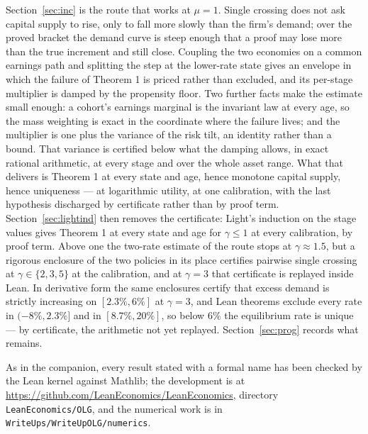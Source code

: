 Section~\ref{sec:inc} is the route that works at $\mu=1$. Single crossing does not ask capital supply
to rise, only to fall more slowly than the firm's demand; over the proved bracket the demand curve is
steep enough that a proof may lose more than the true increment and still close. Coupling the two
economies on a common earnings path and splitting the step at the lower-rate state gives an envelope
in which the failure of Theorem 1 is priced rather than excluded, and its per-stage multiplier is
damped by the propensity floor. Two further facts make the estimate small enough: a cohort's earnings
marginal is the invariant law at every age, so the mass weighting is exact in the coordinate where the
failure lives; and the multiplier is one plus the variance of the risk tilt, an identity rather than a
bound. That variance is certified below what the damping allows, in exact rational arithmetic, at every
stage and over the whole asset range. What that delivers is Theorem 1 at every state and age, hence
monotone capital supply, hence uniqueness --- at logarithmic utility, at one calibration, with the last
hypothesis discharged by certificate rather than by proof term. Section~\ref{sec:lightind} then
removes the certificate: Light's induction on the stage values gives Theorem 1 at every state and age
for $\gamma\le1$ at every calibration, by proof term. Above one the two-rate estimate of the route
stops at $\gamma\approx1.5$, but a rigorous enclosure of the two policies in its place certifies
pairwise single crossing at $\gamma\in\{2,3,5\}$ at the calibration, and at $\gamma=3$ that
certificate is replayed inside Lean. In derivative form the same enclosures certify that excess
demand is strictly increasing on $[2.3\%,6\%]$ at $\gamma=3$, and Lean theorems exclude every rate
in $(-8\%,2.3\%]$ and in $[8.7\%,20\%]$, so below $6\%$ the equilibrium rate is unique --- by
certificate, the arithmetic not yet replayed. Section~\ref{sec:prog} records what remains.

As in the companion, every result stated with a formal name has been checked by the Lean kernel
against Mathlib; the development is at
\url{https://github.com/LeanEconomics/LeanEconomics}, directory \texttt{LeanEconomics/OLG}, and
the numerical work is in \texttt{WriteUps/WriteUpOLG/numerics}.
